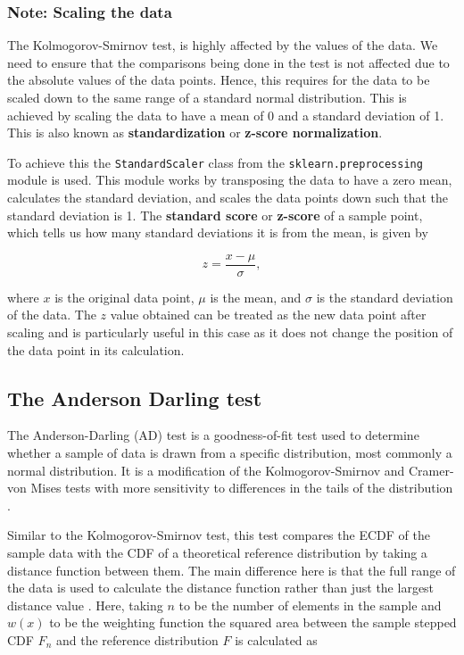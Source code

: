 \documentclass[12pt]{article}
\begin{document}
\subsubsection{Note: Scaling the data}\label{Scaling}

\noindent The Kolmogorov-Smirnov test, is highly affected by the values of the data. We need to ensure that the comparisons being done in the test is not affected due to the absolute values of the data points. Hence, this requires for the data to be scaled down to the same range of a standard normal distribution. This is achieved by scaling the data to have a mean of 0 and a standard deviation of 1. This is also known as \textbf{standardization} or \textbf{z-score normalization}.

\medskip
\noindent To achieve this the \texttt{StandardScaler} class from the \texttt{sklearn.preprocessing} module is used. This module works by transposing the data to have a zero mean, calculates the standard deviation, and scales the data points down such that the standard deviation is 1. The \textbf{standard score} or \textbf{z-score} of a sample point, which tells us how many standard deviations it is from the mean, is given by

\begin{equation}
    z = \frac{x - \mu}{\sigma},
    \label{eq:scaling_formula}
\end{equation}

\medskip
\noindent where $x$ is the original data point, $\mu$ is the mean, and $\sigma$ is the standard deviation of the data. The $z$ value obtained can be treated as the new data point after scaling and is particularly useful in this case as it does not change the position of the data point in its calculation.

\subsection{The Anderson Darling test}\label{AndersonDarling}

The Anderson-Darling (AD) test is a goodness-of-fit test used to determine whether a sample of data is drawn from a specific distribution, most commonly a normal distribution. It is a modification of the Kolmogorov-Smirnov and Cramer-von Mises tests with more sensitivity to differences in the tails of the distribution \cite{guthrie_nistsematech_2020, Michael_2025_statsref}.

\medskip
\noindent Similar to the Kolmogorov-Smirnov test, this test compares the ECDF of the sample data with the CDF of a theoretical reference distribution by taking a distance function between them. The main difference here is that the full range of the data is used to calculate the distance function rather than just the largest distance value \cite{Michael_2025_statsref}. Here, taking $n$ to be the number of elements in the sample and $w(x)$ to be the weighting function the squared area between the sample stepped CDF $F_n$ and the reference distribution $F$ is calculated as
\end{document}
